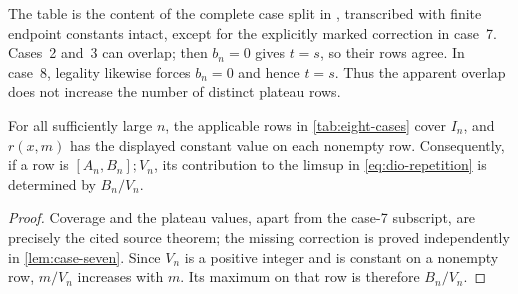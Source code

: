 \begingroup
\scriptsize
\setlength{\tabcolsep}{3.2pt}
\renewcommand{\arraystretch}{1.16}

\endgroup

The table is the content of the complete case split in
\cite[Theorem~2.2.1]{Wojcik2025v1}, transcribed with finite endpoint constants
intact, except for the explicitly marked correction in case~7.  Cases~2 and~3
can overlap; then $b_n=0$ gives $t=s$, so their rows agree.  In case~8,
legality likewise forces $b_n=0$ and hence $t=s$.  Thus the apparent overlap
does not increase the number of distinct plateau rows.

\begin{proposition}
\label{prop:finite-interface}
For all sufficiently large $n$, the applicable rows in
\cref{tab:eight-cases} cover $I_n$, and $r(x,m)$ has the displayed constant
value on each nonempty row.  Consequently, if a row is $[A_n,B_n];V_n$, its
contribution to the limsup in \eqref{eq:dio-repetition} is determined by
$B_n/V_n$.
\end{proposition}

\begin{proof}
Coverage and the plateau values, apart from the case-7 subscript, are precisely
the cited source theorem; the missing correction is proved independently in
\cref{lem:case-seven}.  Since $V_n$ is a positive integer and is constant on a
nonempty row, $m/V_n$ increases with $m$.  Its maximum on that row is therefore
$B_n/V_n$.
\end{proof}

